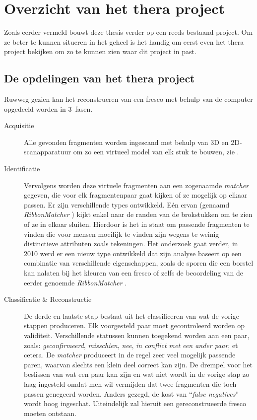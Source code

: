 \chapter{Overzicht van het thera project}
\label{hoofdstuk:overzicht}
Zoals eerder vermeld bouwt deze thesis verder op een reeds bestaand project. Om ze beter te kunnen situeren in het geheel is het handig om eerst even het thera project bekijken om zo te kunnen zien waar dit project in past.

\section{De opdelingen van het thera project}
Ruwweg gezien kan het reconstrueren van een fresco met behulp van de computer opgedeeld worden in 3~fasen.

\begin{description}
	\item[Acquisitie] Alle gevonden fragmenten worden ingescand met behulp van 3D en 2D-scanapparatuur om zo een virtueel model van elk stuk te bouwen, zie \cite{Brown2008}.  
	\item[Identificatie] Vervolgens worden deze virtuele fragmenten aan een zogenaamde \emph{matcher} gegeven, die voor elk fragmentenpaar gaat kijken of ze mogelijk op elkaar passen. Er zijn verschillende types ontwikkeld. E\'en ervan (genaamd \emph{RibbonMatcher} \cite{Brown2008}) kijkt enkel naar de randen van de brokstukken om te zien of ze in elkaar sluiten. Hierdoor is het in staat om passende fragmenten te vinden die voor mensen moeilijk te vinden zijn wegens te weinig distinctieve attributen zoals tekeningen. Het onderzoek gaat verder, in 2010 werd er een nieuw type ontwikkeld dat zijn analyse baseert op een combinatie van verschillende eigenschappen, zoals de sporen die een borstel kan nalaten bij het kleuren van een fresco of zelfs de beoordeling van de eerder genoemde \emph{RibbonMatcher} \cite{TolerFranklin2010}.
	\item[Classificatie \& Reconstructie] De derde en laatste stap bestaat uit het classificeren van wat de vorige stappen produceren. Elk voorgesteld paar moet gecontroleerd worden op validiteit. Verschillende statussen kunnen toegekend worden aan een paar, zoals: \emph{geconfirmeerd}, \emph{misschien}, \emph{nee}, \emph{in conflict met een ander paar}, et cetera. De \emph{matcher} produceert in de regel zeer veel mogelijk passende paren, waarvan slechts een klein deel correct kan zijn. De drempel voor het beslissen van wat een paar kan zijn en wat niet wordt in de vorige stap zo laag ingesteld omdat men wil vermijden dat twee fragmenten die toch passen genegeerd worden. Anders gezegd, de kost van ``\emph{false negatives}'' wordt hoog ingeschat. Uiteindelijk zal hieruit een gereconstrueerde fresco moeten ontstaan.
\end{description}

